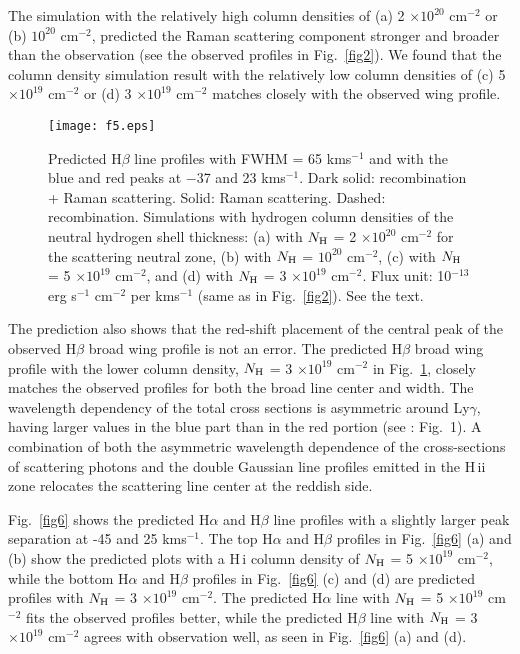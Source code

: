 \documentclass[a4paper,fleqn,usenatbib,useAMS]{mnras}
\def\ha{H{$\alpha$}}
\def\hb{H{$\beta$}}
\def\hi{H\,{\sc i}}
\def\hii{H\,{\sc ii}}
\def\kms{km\hspace{1pt}s$^{-1}$}
\begin{document}
{The simulation with the relatively high column densities of (a) 2 $\times 10^{20}$ cm$^{-2}$ or (b) $10^{20}$ cm$^{-2}$, predicted the Raman scattering component  stronger and broader than the observation (see the observed profiles in  Fig.~\ref{fig2}). We found that the column density simulation result with the relatively low column densities of (c) 5 $\times 10^{19}$ cm$^{-2}$ or (d) 3 $\times 10^{19}$ cm$^{-2}$ matches closely with the observed wing profile.



\begin{figure*}
\texttt{[image: f5.eps]}
\caption{Predicted {\hb} line profiles with FWHM = 65 {\kms} and with the blue and red peaks at $-$37 and 23 {\kms}. Dark solid: recombination + Raman scattering. Solid: Raman scattering. Dashed: recombination. Simulations with hydrogen column densities of the neutral hydrogen shell thickness: (a) with $N_{\rm H}$ = 2 $\times 10^{20}$ cm$^{-2}$ for the scattering neutral zone, (b) with $N_{\rm H}$ = $10^{20}$ cm$^{-2}$, (c) with $N_{\rm H}$ = 5 $\times 10^{19}$ cm$^{-2}$, and (d) with $N_{\rm H}$ = 3 $\times 10^{19}$ cm$^{-2}$.  Flux unit: 10$^{-13}$ erg s$^{-1}$ cm$^{-2}$ per {\kms} (same as in Fig.~\ref{fig2}). See the text. }
\label{fig5}
\end{figure*}

The prediction also shows that the red-shift placement of the central peak of the observed {\hb} broad wing profile is not an error. The predicted {\hb} broad wing profile  with the lower column density, $N_{\rm H}$ = 3 $\times 10^{19}$ cm$^{-2}$ in Fig.~\ref{fig5}, closely matches the observed profiles  for both the broad line center and width. The wavelength dependency of the total cross sections is asymmetric around Ly$\gamma$, having larger values in the blue part than in the red portion (see \citealt{cha15}: Fig.~1). A combination of both the asymmetric wavelength dependence of the cross-sections of scattering photons and the double Gaussian line profiles emitted in the {\hii} zone relocates the scattering line center at the reddish side.

Fig.~\ref{fig6} shows the predicted {\ha} and {\hb} line profiles with a slightly larger peak separation at -45 and 25 {\kms}. The top {\ha} and {\hb} profiles in Fig.~\ref{fig6} (a) and (b) show the predicted plots  with a {\hi} column density of $N_{\rm H}$ = 5 $\times 10^{19}$ cm$^{-2}$, while the bottom {\ha} and {\hb} profiles in Fig.~\ref{fig6} (c) and (d) are predicted profiles with $N_{\rm H}$ = 3 $\times 10^{19}$ cm$^{-2}$. The predicted {\ha} line with $N_{\rm H}$ = 5 $\times 10^{19}$ cm$^{-2}$ fits the observed profiles better, while the predicted {\hb} line  with $N_{\rm H}$ = 3 $\times 10^{19}$ cm$^{-2}$ agrees with observation well, as seen in  Fig.~\ref{fig6} (a) and (d).

}
\end{document}
